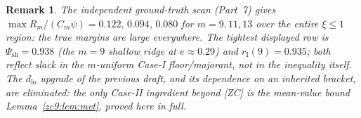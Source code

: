 \documentclass[11pt]{amsart}
\newtheorem{remark}[theorem]{Remark}
\begin{document}
\begin{remark}
The independent ground-truth scan (Part~7) gives
$\max R_m/(C_m\psi)=0.122,\,0.094,\,0.080$ for $m=9,11,13$ over the entire
$\xi\le1$ region: the true margins are large everywhere.  The tightest displayed
row is $\Psi_{\mathrm{sh}}=0.938$ (the $m=9$ shallow ridge at $e\approx0.29$) and
$r_{\mathrm I}(9)=0.935$; both reflect slack in the $m$-uniform Case-I
floor/majorant, not in the inequality itself.  The $d_{\mathrm{lo}}$ upgrade of
the previous draft, and its dependence on an inherited bracket, are eliminated:
the only Case-II ingredient beyond [ZC] is the mean-value bound
Lemma~\ref{zc9:lem:mvt}, proved here in full.
\end{remark}
\end{document}
